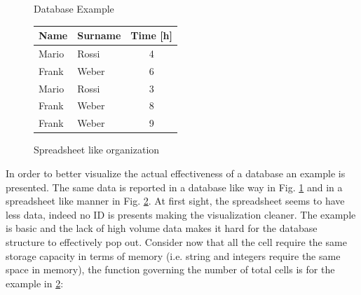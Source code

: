 \documentclass[../main.tex]{subfiles}
\begin{document}
\begin{figure}[H]
    \centering
{}
    \caption{Database Example}
    \label{fig:dbexample}
\end{figure}
\begin{figure}[H]
\begin{center}
\begin{tabular}{ | m{2.5cm} | m{2.5cm}| c | } 
\hline
\textbf{Name} & \textbf{Surname} & \textbf{Time [h]} \\ 
\hline
Mario & Rossi & 4 \\
\hline
Frank & Weber & 6 \\
\hline
Mario & Rossi & 3 \\
\hline
Frank & Weber & 8 \\
\hline
Frank & Weber & 9 \\
\hline
\end{tabular}
\end{center}
    \caption{Spreadsheet like organization}
    \label{fig:spreadsheet}
\end{figure}
In order to better visualize the actual effectiveness of a database an example is presented. The same data is reported in a database like way in Fig. \ref{fig:dbexample} and in a spreadsheet like manner in Fig. \ref{fig:spreadsheet}. At first sight, the spreadsheet seems to have less data, indeed no ID is presents making the visualization cleaner. The example is basic and the lack of high volume data makes it hard for the database structure to effectively pop out. Consider now that all the cell require the same storage capacity in terms of memory (i.e. string and integers require the same space in memory), the function governing the number of total cells is for the example in \ref{fig:spreadsheet}:
\end{document}
